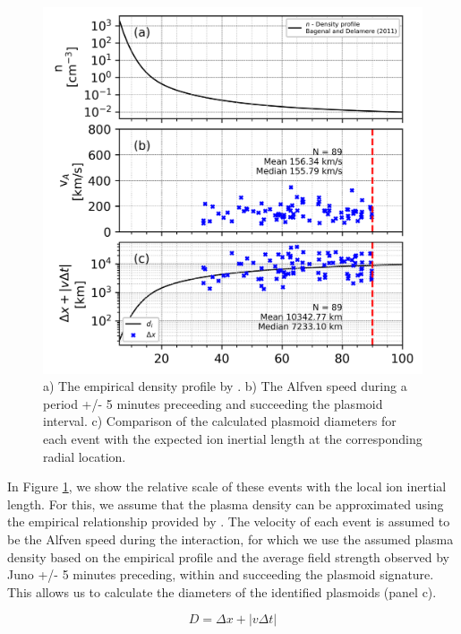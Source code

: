 \begin{figure}
    \centering
    \includegraphics[width=\textwidth]{images6/ion_inertial_selected.png}
    \caption{a) The empirical density profile by \protect\cite{Bagenal2011b}. b) The Alfven speed during a period +/- 5 minutes preceeding and succeeding the plasmoid interval. c) Comparison of the calculated plasmoid diameters for each event with the expected ion inertial length at the corresponding radial location.}
    \label{fig:ion-inertial-scale}
\end{figure}

In Figure \ref{fig:ion-inertial-scale}, we show the relative scale of these events with the local ion inertial length. For this, we assume that the plasma density can be approximated using the empirical relationship provided by . The velocity of each event is assumed to be the Alfven speed during the interaction, for which we use the assumed plasma density based on the empirical profile and the average field strength observed by Juno +/- 5 minutes preceding, within and succeeding the plasmoid signature. This allows us to calculate the diameters of the identified plasmoids (panel c).

\begin{equation}
    D = \Delta x + |v\Delta t |
\end{equation}

